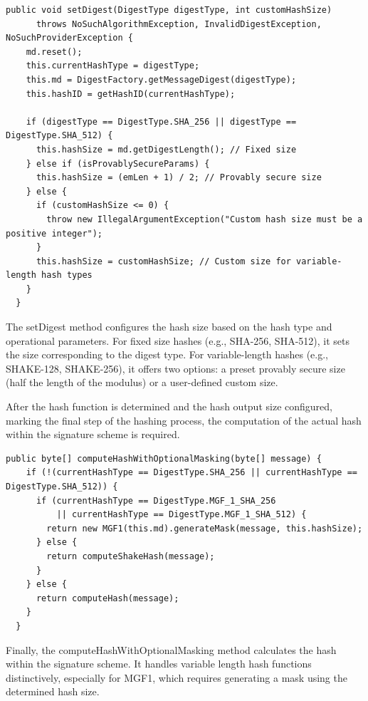 \documentclass[]{final_report}
\theoremstyle{definition}
\begin{document}
   \begin{lstlisting}[caption=Configuration of Hash Size]
public void setDigest(DigestType digestType, int customHashSize)
      throws NoSuchAlgorithmException, InvalidDigestException, NoSuchProviderException {
    md.reset();
    this.currentHashType = digestType;
    this.md = DigestFactory.getMessageDigest(digestType);
    this.hashID = getHashID(currentHashType);

    if (digestType == DigestType.SHA_256 || digestType == DigestType.SHA_512) {
      this.hashSize = md.getDigestLength(); // Fixed size
    } else if (isProvablySecureParams) {
      this.hashSize = (emLen + 1) / 2; // Provably secure size
    } else {
      if (customHashSize <= 0) {
        throw new IllegalArgumentException("Custom hash size must be a positive integer");
      }
      this.hashSize = customHashSize; // Custom size for variable-length hash types
    }
  }
 \end{lstlisting}

The setDigest method configures the hash size based on the hash type and operational parameters. For fixed size hashes (e.g., SHA-256, SHA-512), it sets the size corresponding to the digest type. For variable-length hashes (e.g., SHAKE-128, SHAKE-256), it offers two options: a preset provably secure size (half the length of the modulus) or a user-defined custom size.

After the hash function is determined and the hash output size configured, marking the final step of the hashing process, the computation of the actual hash within the signature scheme is required.
  \begin{lstlisting}[caption=Final Computation of hash]
public byte[] computeHashWithOptionalMasking(byte[] message) {
    if (!(currentHashType == DigestType.SHA_256 || currentHashType == DigestType.SHA_512)) {
      if (currentHashType == DigestType.MGF_1_SHA_256
          || currentHashType == DigestType.MGF_1_SHA_512) {
        return new MGF1(this.md).generateMask(message, this.hashSize);
      } else {
        return computeShakeHash(message);
      }
    } else {
      return computeHash(message);
    }
  }
 \end{lstlisting}
Finally, the computeHashWithOptionalMasking method calculates the hash within the signature scheme. It handles variable length hash functions distinctively, especially for MGF1, which requires generating a mask using the determined hash size.
\end{document}
